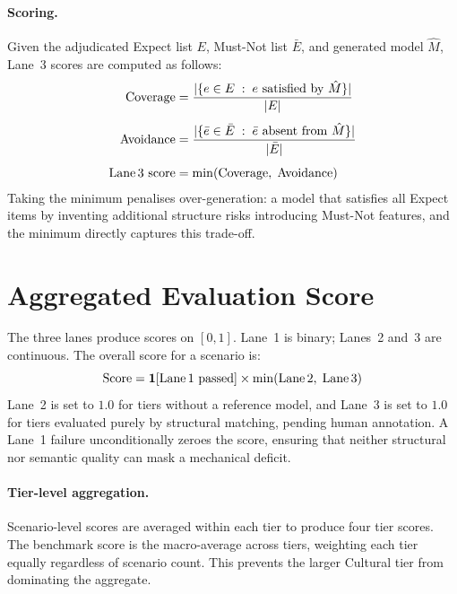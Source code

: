 \documentclass{article}
\begin{document}
\paragraph{Scoring.}
Given the adjudicated Expect list $E$, Must-Not list $\bar{E}$, and generated
model $\hat{M}$, Lane~3 scores are computed as follows:
\begin{align}
  \text{Coverage}  &= \frac{|\{e \in E \;:\; e \text{ satisfied by } \hat{M}\}|}{|E|}\\[4pt]
  \text{Avoidance} &= \frac{|\{\bar{e} \in \bar{E} \;:\; \bar{e} \text{ absent from } \hat{M}\}|}{|\bar{E}|}\\[4pt]
  \text{Lane\,3 score} &= \min(\text{Coverage},\;\text{Avoidance})
\end{align}
Taking the minimum penalises over-generation: a model that satisfies all
Expect items by inventing additional structure risks introducing Must-Not
features, and the minimum directly captures this trade-off.

\section{Aggregated Evaluation Score}
\label{sec:aggregation}

The three lanes produce scores on $[0,1]$. Lane~1 is binary; Lanes~2 and~3
are continuous. The overall score for a scenario is:
\begin{equation}
  \text{Score} =
    \mathbf{1}[\text{Lane\,1 passed}]
    \times \min(\text{Lane\,2},\;\text{Lane\,3})
\end{equation}
Lane~2 is set to $1.0$ for tiers without a reference model, and Lane~3 is
set to $1.0$ for tiers evaluated purely by structural matching, pending human
annotation. A Lane~1 failure unconditionally zeroes the score, ensuring that
neither structural nor semantic quality can mask a mechanical deficit.

\paragraph{Tier-level aggregation.}
Scenario-level scores are averaged within each tier to produce four tier
scores. The benchmark score is the macro-average across tiers, weighting each
tier equally regardless of scenario count. This prevents the larger Cultural
tier from dominating the aggregate.

\newpage

\end{document}
